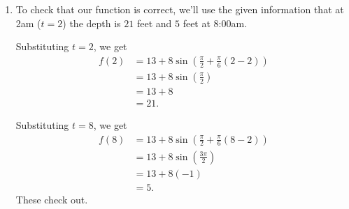 \documentclass{ximera}
\begin{document}
\begin{example}
\begin{enumerate}
Since $a(2) = \pi/2$, the polar angle function is
\begin{align*}
   \theta &= a(t)    \\
             &= a(2) + \frac{\Delta \theta}{\Delta t} \left( t-2 \right) \\
              &= \frac{\pi}{2} + \frac{\pi}{6} \left(  t-2 \right) .
\end{align*}
Substituting this expression for the polar angle in the function
\[
 h = g(\theta) = 13 + 8\sin\theta \, , \, 0\leq \theta \leq 24,
\]
we get
\begin{align*}
 h  &= f(t) \\
     &= g(a(t)) \\
     &= g\left( \frac{\pi}{2} + \frac{\pi}{6} \left(  t-2 \right) \right) \\
     &= 13 + 8 \sin\left( \frac{\pi}{2} + \frac{\pi}{6} \left(  t-2 \right) \right) \, , \, 0\leq \theta \leq 24,
\end{align*}
for the function that expresses the water's depth (in feet) in terms of the number of hours past midnight, October 29.

\item To check that our function is correct, we'll use the given information that at 2am ($t=2$) the depth is $21$ feet and  $5$ feet at 8:00am.

Substituting $t=2$, we get
\begin{align*}
   f(2)   & = 13 + 8 \sin \left(\frac{\pi}{2} + \frac{\pi}{6} \left( 2-2 \right) \right) \\ 
           & = 13 + 8 \sin (\frac{\pi}{2})  \\ 
           & = 13 + 8 \\
           & = 21 .
\end{align*}

Substituting $t=8$, we get
\begin{align*}
   f(8)   & = 13 + 8 \sin \left(\frac{\pi}{2} + \frac{\pi}{6} \left( 8-2 \right) \right) \\ 
           & = 13 + 8 \sin \left( \frac{3\pi}{2} \right)  \\ 
           & = 13 + 8(-1) \\
           & = 5 .
\end{align*}
These check out.

\end{enumerate}
\end{example}
\end{document}
